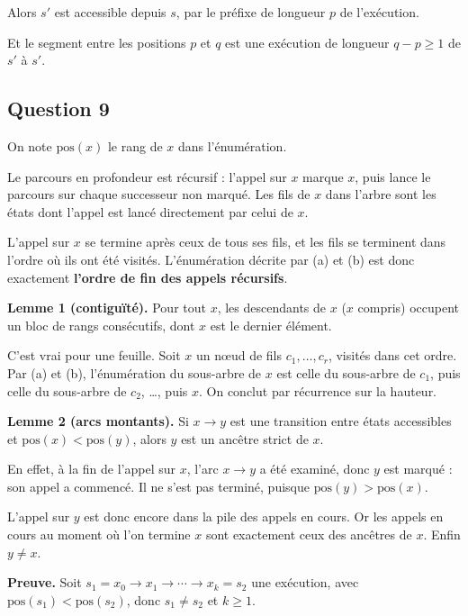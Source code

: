 \documentclass[11pt,a4paper]{article}
\begin{document}
Alors \(s'\) est accessible depuis \(s\), par le préfixe de longueur \(p\) de l'exécution.

Et le segment entre les positions \(p\) et \(q\) est une exécution de longueur \(q-p\ge1\) de \(s'\) à \(s'\).

\hypertarget{question-9}{%
\subsection{Question 9}\label{question-9}}

On note \(\mathrm{pos}(x)\) le rang de \(x\) dans l'énumération.

Le parcours en profondeur est récursif : l'appel sur \(x\) marque \(x\), puis lance le parcours sur chaque successeur non marqué. Les fils de \(x\) dans l'arbre sont les états dont l'appel est lancé directement par celui de \(x\).

L'appel sur \(x\) se termine après ceux de tous ses fils, et les fils se terminent dans l'ordre où ils ont été visités. L'énumération décrite par (a) et (b) est donc exactement \textbf{l'ordre de fin des appels récursifs}.

\textbf{Lemme 1 (contiguïté).} Pour tout \(x\), les descendants de \(x\) (\(x\) compris) occupent un bloc de rangs consécutifs, dont \(x\) est le dernier élément.

C'est vrai pour une feuille. Soit \(x\) un nœud de fils \(c_1,\dots,c_r\), visités dans cet ordre. Par (a) et (b), l'énumération du sous-arbre de \(x\) est celle du sous-arbre de \(c_1\), puis celle du sous-arbre de \(c_2\), \ldots, puis \(x\). On conclut par récurrence sur la hauteur.

\textbf{Lemme 2 (arcs montants).} Si \(x\to y\) est une transition entre états accessibles et \(\mathrm{pos}(x)<\mathrm{pos}(y)\), alors \(y\) est un ancêtre strict de \(x\).

En effet, à la fin de l'appel sur \(x\), l'arc \(x\to y\) a été examiné, donc \(y\) est marqué : son appel a commencé. Il ne s'est pas terminé, puisque \(\mathrm{pos}(y)>\mathrm{pos}(x)\).

L'appel sur \(y\) est donc encore dans la pile des appels en cours. Or les appels en cours au moment où l'on termine \(x\) sont exactement ceux des ancêtres de \(x\). Enfin \(y\neq x\).

\textbf{Preuve.} Soit \(s_1=x_0\to x_1\to\cdots\to x_k=s_2\) une exécution, avec \(\mathrm{pos}(s_1)<\mathrm{pos}(s_2)\), donc \(s_1\neq s_2\) et \(k\ge1\).
\end{document}
